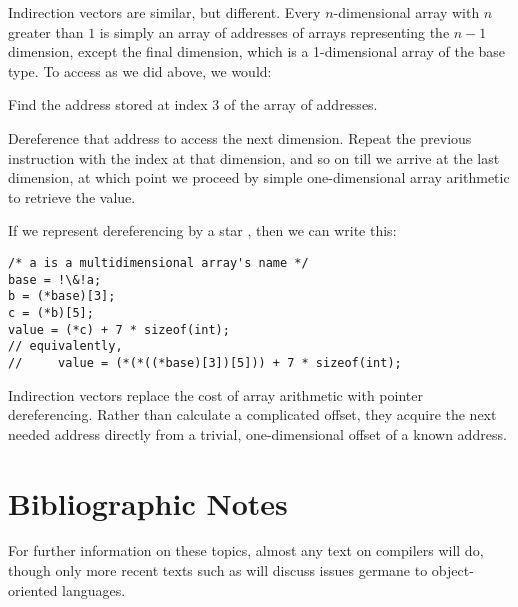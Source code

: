 Indirection vectors are similar, but different. Every $n$-dimensional array with $n$ greater than $1$ is simply an array of addresses of arrays representing the $n - 1$ dimension, except the final dimension, which is a 1-dimensional array of the base type. To access  as we did above, we would:
\begin{aenumerate}
\item Find the address stored at index 3 of the array of addresses.
\item Dereference that address to access the next dimension. Repeat the previous instruction with the index at that dimension, and so on till we arrive at the last dimension, at which point we proceed by simple one-dimensional array arithmetic to retrieve the value.
\end{aenumerate}
If we represent dereferencing by a star \code{*}, then we can write this:
\begin{lstlisting}[escapechar=!]
/* a is a multidimensional array's name */
base = !\&!a;
b = (*base)[3];
c = (*b)[5];
value = (*c) + 7 * sizeof(int); 
// equivalently, 
//     value = (*(*((*base)[3])[5])) + 7 * sizeof(int);
\end{lstlisting}

Indirection vectors replace the cost of array arithmetic with pointer dereferencing. Rather than calculate a complicated offset, they acquire the next needed address directly from a trivial, one-dimensional offset of a known address.%

\section{Bibliographic Notes}\label{imperative:compiling:notes}
For further information on these topics, almost any text on compilers will do, though only more recent texts such as \citet{Cooper:Engineering:2004} will discuss issues germane to object-oriented languages.
